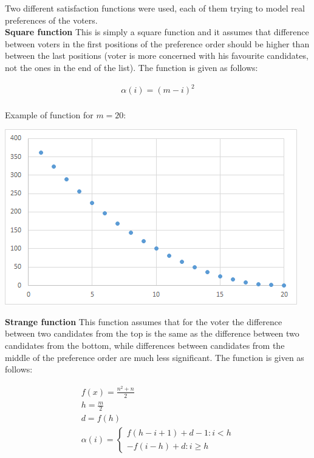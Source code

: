 Two different satisfaction functions were used, each of them trying to model real preferences of the voters.
\\

\noindent
\textbf{Square function} \hspace{.1in} This is simply a square function and it assumes that difference between voters in the first positions of the preference order should be higher than between the last positions (voter is more concerned with his favourite candidates, not the ones in the end of the list). The function is given as follows:

\begin{gather}
	\alpha(i) = (m - i)^{2}
\end{gather}
\\

Example of function for $m = 20$:

\begin{center}
	\includegraphics[scale=0.7]{satfun1}
\end{center}

\noindent
\textbf{Strange function} \hspace{.1in} This function assumes that for the voter the difference between two candidates from the top is the same as the difference between two candidates from the bottom, while differences between candidates from the middle of the preference order are much less significant. The function is given as follows:

\begin{gather}
	f(x) = \frac{n^{2}+n}{2} \\
	h = \frac{m}{2} \\
	d = f(h) \\
	\alpha(i) = \begin{cases} f(h-i+1)+d-1 : i<h \\ -f(i-h)+d : i \geq h \end{cases}
\end{gather}
\\

